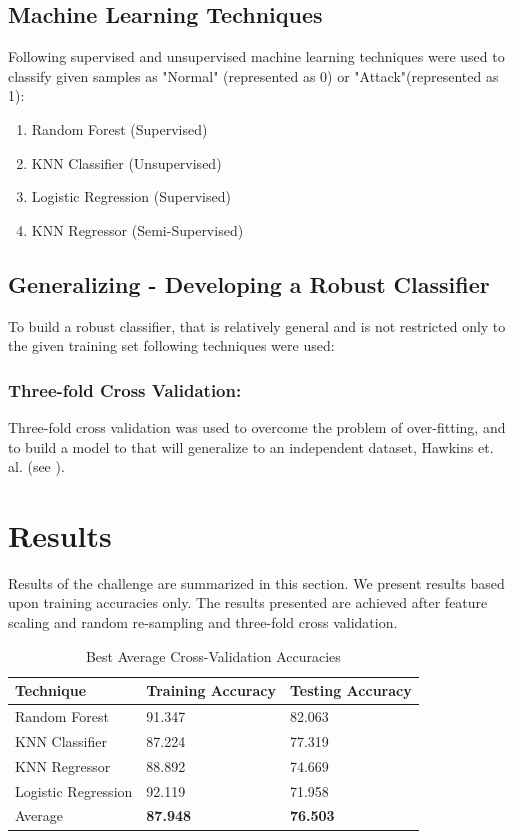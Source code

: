 \documentclass{llncs}
\begin{document}
\subsection{Machine Learning Techniques}
Following supervised and unsupervised machine learning techniques were used to classify given samples as "Normal" (represented as 0) or "Attack"(represented as 1):
\begin{enumerate}
   \item Random Forest (Supervised)
   \item KNN Classifier (Unsupervised)
   \item Logistic Regression (Supervised)
   \item KNN Regressor (Semi-Supervised)
 \end{enumerate}
 
\subsection{Generalizing - Developing a Robust Classifier}
To build a robust classifier, that is relatively general and is not restricted only to the given training set following techniques were used:

\subsubsection{Three-fold Cross Validation:} Three-fold cross validation was used to overcome the problem of over-fitting, and to build a model to that will generalize to an independent dataset, Hawkins et. al. (see \cite{hawkins:eke}).  


\section{Results}
Results of the challenge are summarized in this section. We present results based upon training accuracies only. The results presented are achieved after feature scaling and random re-sampling and three-fold cross validation.

\begin{table}
	\centering
	\caption{Best Average Cross-Validation Accuracies}
	\begin{tabular}{ |p{3cm}||p{3cm}||p{3cm}|}
		\hline
		Technique                  &Training Accuracy &Testing Accuracy\\
		\hline
		Random Forest              &91.347 &82.063\\
		KNN Classifier             &87.224 &77.319\\
		KNN Regressor              &88.892 &74.669\\
		Logistic Regression        &92.119 &71.958\\
		\hline
		 Average     &\textbf{87.948} &\textbf{76.503}\\
		 \hline
	\end{tabular}
	\label{table}
\end{table}
\end{document}
